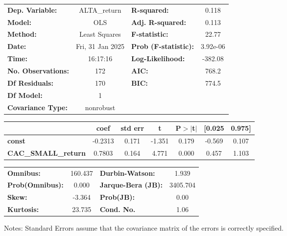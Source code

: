 \documentclass{report}
\begin{document}
\begin{center}
\begin{tabular}{lclc}
\toprule
\textbf{Dep. Variable:}     &   ALTA\_return   & \textbf{  R-squared:         } &     0.118   \\
\textbf{Model:}             &       OLS        & \textbf{  Adj. R-squared:    } &     0.113   \\
\textbf{Method:}            &  Least Squares   & \textbf{  F-statistic:       } &     22.77   \\
\textbf{Date:}              & Fri, 31 Jan 2025 & \textbf{  Prob (F-statistic):} &  3.92e-06   \\
\textbf{Time:}              &     16:17:16     & \textbf{  Log-Likelihood:    } &   -382.08   \\
\textbf{No. Observations:}  &         172      & \textbf{  AIC:               } &     768.2   \\
\textbf{Df Residuals:}      &         170      & \textbf{  BIC:               } &     774.5   \\
\textbf{Df Model:}          &           1      & \textbf{                     } &             \\
\textbf{Covariance Type:}   &    nonrobust     & \textbf{                     } &             \\
\bottomrule
\end{tabular}
\begin{tabular}{lcccccc}
                            & \textbf{coef} & \textbf{std err} & \textbf{t} & \textbf{P$> |$t$|$} & \textbf{[0.025} & \textbf{0.975]}  \\
\midrule
\textbf{const}              &      -0.2313  &        0.171     &    -1.351  &         0.179        &       -0.569    &        0.107     \\
\textbf{CAC\_SMALL\_return} &       0.7803  &        0.164     &     4.771  &         0.000        &        0.457    &        1.103     \\
\bottomrule
\end{tabular}
\begin{tabular}{lclc}
\textbf{Omnibus:}       & 160.437 & \textbf{  Durbin-Watson:     } &    1.939  \\
\textbf{Prob(Omnibus):} &   0.000 & \textbf{  Jarque-Bera (JB):  } & 3405.704  \\
\textbf{Skew:}          &  -3.364 & \textbf{  Prob(JB):          } &     0.00  \\
\textbf{Kurtosis:}      &  23.735 & \textbf{  Cond. No.          } &     1.06  \\
\bottomrule
\end{tabular}
\end{center}

Notes: \newline
 [1] Standard Errors assume that the covariance matrix of the errors is correctly specified.
\end{document}

